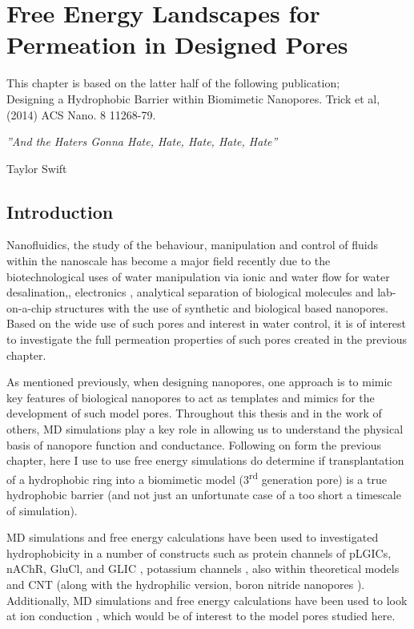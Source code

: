\chapter{Free Energy Landscapes for Permeation in Designed Pores}
\label{ch:RC2}

This chapter is based on the latter half of the following publication; \\
Designing a Hydrophobic Barrier within Biomimetic Nanopores. Trick et al, (2014)
ACS Nano. 8 11268-79.
 
\epigraph{{\textit{''And the Haters Gonna Hate, Hate, Hate, Hate, Hate''}}}{Taylor Swift}


\section{Introduction}

Nanofluidics, the study of the behaviour, manipulation and control of fluids within the nanoscale has become a major field recently due to the biotechnological uses of water manipulation via ionic and water flow for water desalination,\cite{Kim2010,Corry2011c,Yang2013b,Chan2013,Liu2015}, electronics \cite{Vlassiouk2008b,Pardon2013}, analytical separation of biological molecules \cite{Cao2002} and lab-on-a-chip structures \cite{Herold2009} with the use of synthetic and biological based nanopores. Based on the wide use of such pores and interest in water control, it is of interest to investigate the full permeation properties of such pores created in the previous chapter.  

As mentioned previously, when designing nanopores, one approach is to mimic key features of biological nanopores to act as templates and mimics for the development of such model pores. 
Throughout this thesis and in the work of others, MD simulations play a key role in allowing us to understand the physical basis of nanopore function and conductance. Following on form the previous chapter, here I use to use free energy simulations do determine if transplantation of a hydrophobic ring into a biomimetic model (3\textsuperscript{rd} generation pore) is a true hydrophobic barrier (and not just an unfortunate case of a too short a timescale of simulation).

MD simulations and free energy calculations have been used to investigated hydrophobicity in a number of constructs such as protein channels of pLGICs, nAChR, GluCl, and GLIC  \cite{Beckstein2006b,Yoluk2015,Zhu2010,Zhu2012}, potassium channels \cite{Berneche2001,Fowler2013,Aryal2014g}, also within theoretical models and CNT \cite{Hummer2001,Waghe2002c,Garate2014} (along with the hydrophilic version, boron nitride nanopores \cite{Won2007,Hilder2009,Hilder2012}). Additionally, MD simulations and free energy calculations have been used to look at ion conduction \cite{Peter2005,Allen2006}, which would be of interest to the model pores studied here.

